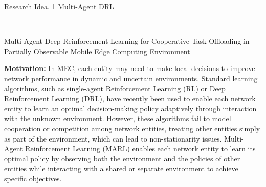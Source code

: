 \documentclass[12pt]{article}
\begin{document}
\begin{center} 
	
	
	\vspace{-17mm}

	\large Research Idea. 1  \hfill Multi-Agent DRL \vspace{1mm} \hrule
	
	\vspace{-1mm}
	
	\textcolor{white}{i} \\ \LARGE Multi-Agent Deep Reinforcement Learning for Cooperative Task Offloading in Partially Observable Mobile Edge Computing Environment \vspace{6mm}\\ 

\end{center} \small
\vspace{-5mm}

\noindent\textbf{\large Motivation:  }
\noindent
In MEC, each entity may need to make local decisions to improve network performance in dynamic and uncertain environments. Standard learning algorithms, such as single-agent Reinforcement Learning (RL) or Deep Reinforcement Learning (DRL), have recently been used to enable each network entity to learn an optimal decision-making policy adaptively through interaction with the unknown environment. However, these algorithms fail to model cooperation or competition among network entities, treating other entities simply as part of the environment, which can lead to non-stationarity issues. Multi-Agent Reinforcement Learning (MARL) enables each network entity to learn its optimal policy by observing both the environment and the policies of other entities while interacting with a shared or separate environment to achieve specific objectives.
 


\end{document}
